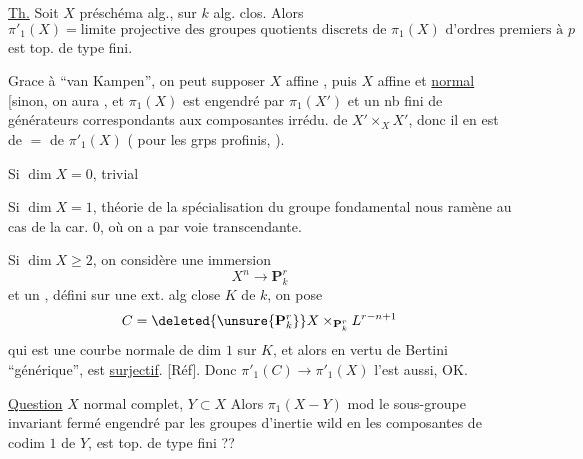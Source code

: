 \uline{Th.} Soit $X$ préschéma alg., sur $k$ alg. clos. Alors
\[
\pi'_1(X)=\text{limite projective des groupes quotients discrets de }\pi_1(X)
\text{ d'ordres premiers à }p
\]
est top. de type fini.

Grace à ``van Kampen'', on peut supposer $X$ affine
,
puis $X$ affine et \uline{normal}
[sinon, on aura
, et $\pi_1(X)$ est engendré par $\pi_1(X')$ et un nb fini de générateurs
correspondants aux composantes irrédu. de $X'\times_X X'$, donc il en est de $=$
de $\pi'_1(X)$
( pour les grps profinis,
). 

Si $\dim X=0$, trivial

Si $\dim X=1$, théorie de la spécialisation du groupe fondamental
nous ramène au cas de la car.  $0$, où on a
 par voie transcendante.

Si $\dim X\geq2$, on considère une immersion
\[
X^n\longrightarrow \mathbf P_k^r
\]
et un  
, défini sur une
ext. alg close $K$ de $k$, on pose
\[
C=\deleted{\unsure{\mathbf P_k^r}}X\times_{\mathbf P_k^r}L^{r-n+1}
\]
qui est une courbe normale de dim $1$ sur $K$, et alors en vertu de
Bertini ``générique'',
est \uline{surjectif}. [Réf]. Donc $\pi'_1(C)\to\pi'_1(X)$ l'est
aussi, OK.

\uline{Question} $X$ normal complet, $Y\subset X$
Alors $\pi_1(X-Y)$ mod le sous-groupe invariant fermé engendré
par les groupes d'inertie wild en les composantes de
codim $1$ de $Y$, est  top. de type fini ??
